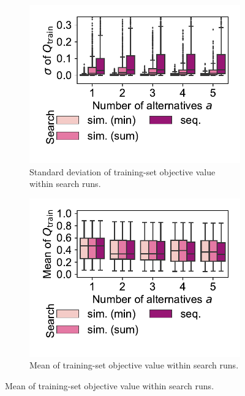 \documentclass{article}
\theoremstyle{definition}
\begin{document}
\begin{figure}[p]
	\centering
	\begin{subfigure}[t]{0.48\textwidth}
		\centering
		\includegraphics[width=\textwidth, trim=15 25 15 10, clip]{plots/afs-impact-search-stddev-train-objective.pdf}
		\caption{Standard deviation of training-set objective value within search runs.}
		\label{fig:afs:impact-search-stddev-train-objective}
	\end{subfigure}
	\hfill
	\begin{subfigure}[t]{0.48\textwidth}
		\centering
		\includegraphics[width=\textwidth, trim=15 25 15 10, clip]{plots/afs-impact-search-mean-train-objective.pdf}
		\caption{Mean of training-set objective value within search runs.}

\end{subfigure}
\end{figure}
\end{document}
